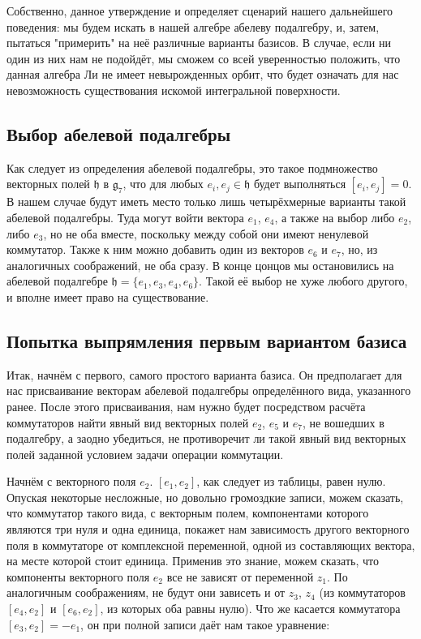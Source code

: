 \documentclass[a4paper]{article}
\begin{document}
Собственно, данное утверждение и определяет сценарий нашего дальнейшего поведения: мы будем искать в нашей алгебре абелеву подалгебру, и, затем, пытаться "примерить" на неё различные варианты базисов. В случае, если ни один из них нам не подойдёт, мы сможем со всей уверенностью положить, что данная алгебра Ли не имеет невырожденных орбит, что будет означать для нас невозможность существования искомой интегральной поверхности.

\subsection{Выбор абелевой подалгебры}
Как следует из определения абелевой подалгебры, это такое подмножество векторных полей $\mathfrak{h}$ в $\mathfrak{g}_{7}$, что для любых $e_{i}, e_{j} \in \mathfrak{h}$ будет выполняться $[e_{i}, e_{j}]=0$. В нашем случае будут иметь место только лишь четырёхмерные варианты такой абелевой подалгебры. Туда могут войти вектора $e_{1}$, $e_{4}$, а также на выбор либо $e_{2}$, либо $e_{3}$, но не оба вместе, поскольку между собой они имеют ненулевой коммутатор. Также к ним можно добавить один из векторов $e_{6}$ и $e_{7}$, но, из аналогичных соображений, не оба сразу. В конце цонцов мы остановились на абелевой подалгебре $\mathfrak{h}=\{e_{1}, e_{3}, e_{4}, e_{6}\}$. Такой её выбор не хуже любого другого, и вполне имеет право на существование.

\subsection{Попытка выпрямления первым вариантом базиса}
Итак, начнём с первого, самого простого варианта базиса. Он предполагает для нас присваивание векторам абелевой подалгебры определённого вида, указанного ранее. После этого присваивания, нам нужно будет посредством расчёта коммутаторов найти явный вид векторных полей $e_{2}$, $e_{5}$ и $e_{7}$, не вошедших в подалгебру, а заодно убедиться, не противоречит ли такой явный вид векторных полей заданной условием задачи операции коммутации.

Начнём с векторного поля $e_{2}$. $[e_{1}, e_{2}]$, как следует из таблицы, равен нулю. Опуская некоторые несложные, но довольно громоздкие записи, можем сказать, что коммутатор такого вида, с векторным полем, компонентами которого являются три нуля и одна единица, покажет нам зависимость другого векторного поля в коммутаторе от комплексной переменной, одной из составляющих вектора, на месте которой стоит единица. Применив это знание, можем сказать, что компоненты векторного поля $e_{2}$ все не зависят от переменной $z_{1}$. По аналогичным соображениям, не будут они зависеть и от $z_{3}$, $z_{4}$ (из коммутаторов $[e_{4}, e_{2}]$ и $[e_{6}, e_{2}]$, из которых оба равны нулю). Что же касается коммутатора $[e_{3}, e_{2}] = -e_{1}$, он при полной записи даёт нам такое уравнение:
\end{document}

